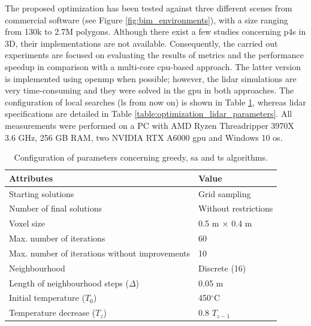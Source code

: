 The proposed optimization has been tested against three different scenes from commercial software (see Figure \ref{fig:bim_environments}), with a size ranging from 130k to 2.7M polygons. Although there exist a few studies concerning \acrshort{p4s} in 3D, their implementations are not available. Consequently, the carried out experiments are focused on evaluating the results of metrics and the performance speedup in comparison with a multi-core \acrshort{cpu}-based approach. The latter version is implemented using \acrshort{openmp} when possible; however, the \acrshort{lidar} simulations are very time-consuming and they were solved in the \acrshort{gpu} in both approaches. The configuration of local searches (\acrshort{ls} from now on) is shown in Table \ref{table:local_search_settings}, whereas \acrshort{lidar} specifications are detailed in Table \ref{table:optimization_lidar_parameters}. All measurements were performed on a PC with AMD Ryzen Threadripper 3970X 3.6 GHz, 256 GB RAM, two NVIDIA RTX A6000 \acrshort{gpu} and Windows 10 \acrshort{os}. 

\renewcommand{\arraystretch}{1.15}
\begin{table}[hb]
\caption{Configuration of parameters concerning greedy, \acrshort{sa} and \acrshort{ts} algorithms.}
\label{table:local_search_settings}
\begin{tabular}{@{}ll@{}}
\toprule
\textbf{Attributes} & \textbf{Value}\\
\midrule
Starting solutions & Grid sampling\\
Number of final solutions & Without restrictions\\
Voxel size & 0.5 \si{\meter} $\times\hspace{1mm}$0.4 \si{\meter}\\
\midrule
Max. number of iterations & 60\\
Max. number of iterations without improvements & 10\\
\midrule
Neighbourhood & Discrete (16)\\
Length of neighbourhood steps ($\Delta$) & 0.05 $\si{\meter}$\\
\midrule
Initial temperature ($T_0$) & 450$^{\circ}$C\\
Temperature decrease ($T_z$) & 0.8 $T_{z-1}$\\
\bottomrule
\end{tabular}
\end{table}
\renewcommand{\arraystretch}{1}

